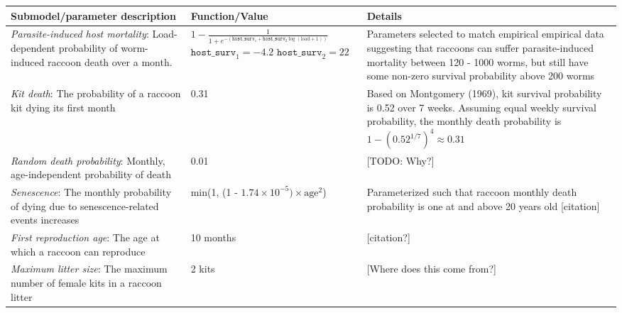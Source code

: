 \documentclass[11pt]{article}
\begin{document}






\clearpage

\linespread{1}
\scriptsize
\renewcommand{\arraystretch}{1.2}
\begin{longtable}{p{4.5cm} p{4.5cm} p{5cm}}
\toprule
\textbf{Submodel/parameter description} & \textbf{Function/Value} & \textbf{Details} \\
\midrule
\emph{Parasite-induced host mortality}: Load-dependent
probability of worm-induced raccoon death over a month. &
$1 - \frac{1}{1 + e^{-(\texttt{host\_surv}_1 + \texttt{host\_surv}_2 \log(\text{load} + 1))}}$ \newline\newline $\texttt{host\_surv}_1 = -4.2$ \newline $\texttt{host\_surv}_2 = 22$ & Parameters selected to match empirical empirical data suggesting that raccoons can suffer parasite-induced mortality between 120 - 1000 worms, but still have some non-zero survival probability above 200 worms \citep{Kazacos2001} \\
\hline
\emph{Kit death}: The probability of a raccoon kit dying its first month & 0.31 & Based on Montgomery (1969), kit survival probability is 0.52 over 7 weeks. Assuming equal weekly survival probability, the monthly death probability is $1 - (0.52^{1/7})^4 \approx 0.31$   \\
\hline
\emph{Random death probability}: Monthly, age-independent probability of death & 0.01 & [TODO: Why?] \\
\hline
\emph{Senescence}: The monthly probability of dying due to senescence-related events increases & min(1, (1 - $1.74\times10^{-5}) \times \text{age}^2$) & Parameterized such that raccoon monthly death probability is one at and above 20 years old [citation] \\
\hline
\emph{First reproduction age}: The age at which a raccoon can reproduce & 10 months & [citation?] \\
\hline
\emph{Maximum litter size}: The maximum number of female kits in a raccoon litter & 2 kits & [Where does this come from?] \\

\end{longtable}
\end{document}
